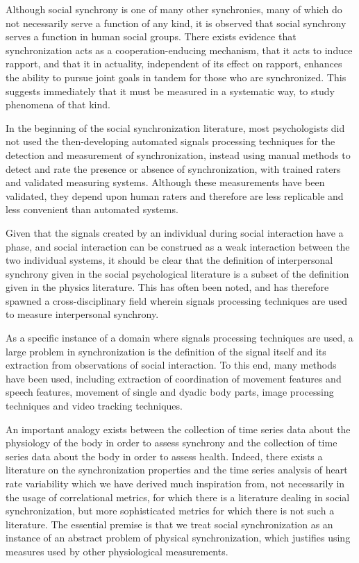 \documentclass[12pt]{article}
\begin{document}
Although social synchrony is one of many other synchronies, many of which do not necessarily serve a function of any kind, it is observed that social synchrony serves a function in human social groups. There exists evidence that synchronization acts as a cooperation-enducing mechanism, that it acts to induce rapport, and that it in actuality, independent of its effect on rapport, enhances the ability to pursue joint goals in tandem for those who are synchronized. This suggests immediately that it must be measured in a systematic way, to study phenomena of that kind. %

In the beginning of the social synchronization literature, most psychologists did not used the then-developing automated signals processing techniques for the detection and measurement of synchronization, instead using manual methods to detect and rate the presence or absence of synchronization, with trained raters and validated measuring systems. Although these measurements have been validated, they depend upon human raters and therefore are less replicable and less convenient than automated systems. %

Given that the signals created by an individual during social interaction have a phase, and social interaction can be construed as a weak interaction between the two individual systems, it should be clear that the definition of interpersonal synchrony given in the social psychological literature is a subset of the definition given in the physics literature. This has often been noted, and has therefore spawned a cross-disciplinary field wherein signals processing techniques are used to measure interpersonal synchrony. %

As a specific instance of a domain where signals processing techniques are used, a large problem in synchronization is the definition of the signal itself and its extraction from observations of social interaction. To this end, many methods have been used, including extraction of coordination of movement features and speech features, movement of single and dyadic body parts, image processing techniques and video tracking techniques. %

An important analogy exists between the collection of time series data about the physiology of the body in order to assess synchrony and the collection of time series data about the body in order to assess health. Indeed, there exists a literature on the synchronization properties and the time series analysis of heart rate variability which we have derived much inspiration from, not necessarily in the usage of correlational metrics, for which there is a literature dealing in social synchronization, but more sophisticated metrics for which there is not such a literature. The essential premise is that we treat social synchronization as an instance of an abstract problem of physical synchronization, which justifies using measures used by other physiological measurements.%
\end{document}
